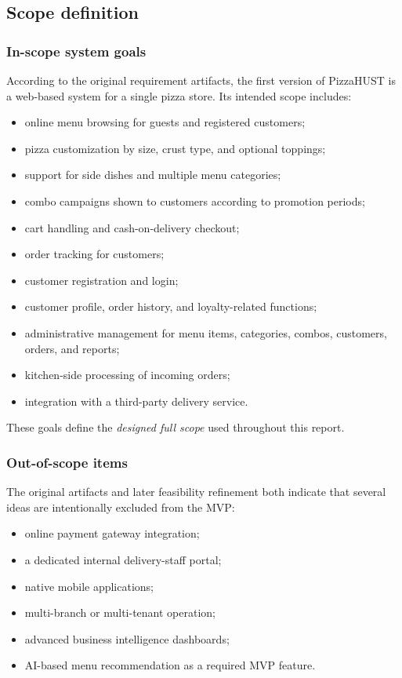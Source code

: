 \subsection{Scope definition}

\subsubsection{In-scope system goals}

According to the original requirement artifacts, the first version of PizzaHUST is a web-based system for a single pizza store. Its intended scope includes:

\begin{itemize}
    \item online menu browsing for guests and registered customers;
    \item pizza customization by size, crust type, and optional toppings;
    \item support for side dishes and multiple menu categories;
    \item combo campaigns shown to customers according to promotion periods;
    \item cart handling and cash-on-delivery checkout;
    \item order tracking for customers;
    \item customer registration and login;
    \item customer profile, order history, and loyalty-related functions;
    \item administrative management for menu items, categories, combos, customers, orders, and reports;
    \item kitchen-side processing of incoming orders;
    \item integration with a third-party delivery service.
\end{itemize}

These goals define the \emph{designed full scope} used throughout this report.

\subsubsection{Out-of-scope items}

The original artifacts and later feasibility refinement both indicate that several ideas are intentionally excluded from the MVP:

\begin{itemize}
    \item online payment gateway integration;
    \item a dedicated internal delivery-staff portal;
    \item native mobile applications;
    \item multi-branch or multi-tenant operation;
    \item advanced business intelligence dashboards;
    \item AI-based menu recommendation as a required MVP feature.
\end{itemize}

